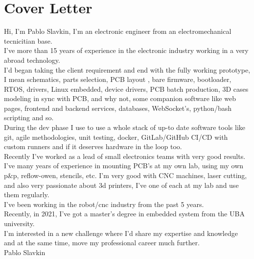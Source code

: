 \section{Cover Letter}
Hi, I'm Pablo Slavkin, I'm an electronic engineer from an electromechanical
tecnicitian base.\\
I've more than 15 years of experience in the electronic
industry working in a very abroad technology.\\
I'd began taking the client requirement and end with the fully working
prototype, I mean schematics, parts selection, PCB layout , bare firmware,
bootloader, RTOS, drivers, Linux embedded, device drivers, PCB batch production,
3D cases modeling in sync with PCB, and why not, some companion software like
web pages, frontend and backend services, databases, WebSocket's, python/bash
scripting and so.\\
During the dev phase I use to use a whole stack of up-to date software tools
like git, agile methodologies, unit testing, docker, GitLab/GitHub CI/CD with
custom runners and if it deserves hardware in the loop too.\\
Recently I've worked as a lead of small electronics teams with very good
results.\\
I've many years of experience in mounting PCB's at my own lab, using my own
p\&p, reflow-owen, stencils, etc. I'm very good with CNC machines, laser
cutting, and also very passionate about 3d printers, I've one of each at my lab
and use them regularly.\\
I've been working in the robot/cnc industry from the past 5 years.\\
Recently, in 2021, I've got a master's degree in embedded system from the UBA
university.\\
I'm interested in a new challenge where I'd share my expertise and knowledge and
at the same time, move my professional career much further.\\
Pablo Slavkin
\pagebreak
